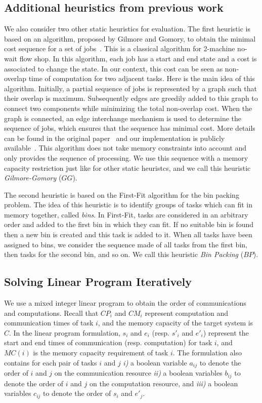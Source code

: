 \documentclass[runningheads]{llncs} %
\begin{document}
\subsection{Additional heuristics from previous work}

We also consider two other static heuristics for evaluation. The first heuristic is based on an algorithm, proposed by Gilmore and Gomory, to obtain the minimal cost sequence for a set of jobs~\cite{Gilmore-Gomory:1964}. This is a classical algorithm for 2-machine no-wait flow shop. In this algorithm, each job has a start and end state and a cost is associated to change the state. In our context, this cost can be seen as non-overlap time of computation for two adjacent tasks. Here is the main idea of this algorithm. Initially, a partial sequence of jobs is represented by a graph such that their overlap is maximum. Subsequently edges are greedily added to this graph to connect two components while minimizing the total non-overlap cost. When the graph is  connected, an edge interchange mechanism is used to determine the sequence of jobs, which ensures that the sequence has minimal cost. More details can be found in the original paper~\cite{Gilmore-Gomory:1964} and our implementation is publicly available~\cite{gitworkrepo}. This algorithm does not take memory constraints into account and only provides the sequence of processing. We use this sequence with a memory capacity restriction just like for other static heuristcs, and we call this heuristic \textit{Gilmore-Gomory} ($GG$).

The second heuristic is based on the First-Fit algorithm for the bin packing problem. The idea of this heuristic is to identify groups of tasks which can fit in memory together, called \emph{bins}. In First-Fit, tasks are considered in an arbitrary order and added to the first bin in which they can fit. If no suitable bin is found then a new bin is created and this task is added to it. When all tasks have been assigned to bins, we consider the sequence made of all tasks from the first bin, then tasks for the second bin, and so on. We call this heuristic \textit{Bin Packing} ($BP$). 


\subsection{Solving Linear Program Iteratively}
\label{subsec:linearprogrammingformulation}
We use a mixed integer linear program to obtain the order of communications and computations. Recall that $CP_i$ and $CM_i$ represent computation and communication times of task $i$, and the memory capacity of the target system is $C$. In the linear program formulation, $s_i$ and $e_i$ (resp. $s'_i$ and $e'_i$) represent the start and end times of communication (resp. computation) for task $i$, and $MC(i)$ is the memory capacity requirement of task $i$. The formulation also contains for each pair of tasks $i$ and $j$ \textit{i)} a boolean variable $a_{ij}$ to denote the order of $i$ and $j$ on the communication resource \textit{ii)} a boolean variables $b_{ij}$ to denote the order of $i$ and $j$ on the computation resource, and \textit{iii)} a boolean variables $c_{ij}$ to denote the order of $s_i$ and $e'_j$. 
\end{document}
